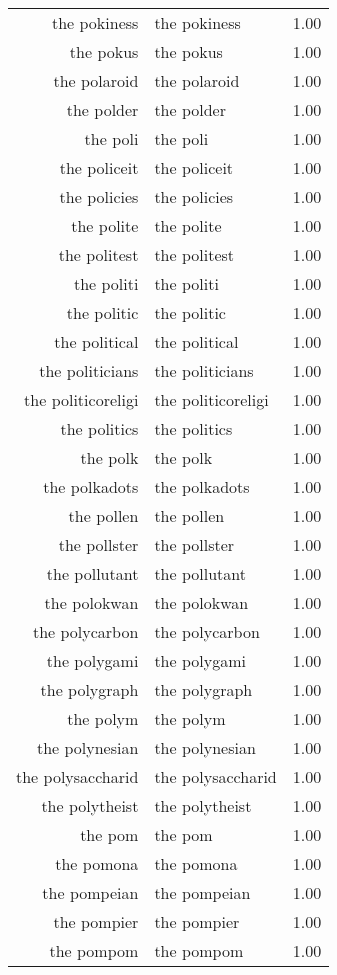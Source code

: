 \begin{table}[ht]
\begin{tabular}{rlr}
  the pokiness & the pokiness & 1.00 \\ 
  the pokus & the pokus & 1.00 \\ 
  the polaroid & the polaroid & 1.00 \\ 
  the polder & the polder & 1.00 \\ 
  the poli & the poli & 1.00 \\ 
  the policeit & the policeit & 1.00 \\ 
  the policies & the policies & 1.00 \\ 
  the polite & the polite & 1.00 \\ 
  the politest & the politest & 1.00 \\ 
  the politi & the politi & 1.00 \\ 
  the politic & the politic & 1.00 \\ 
  the political & the political & 1.00 \\ 
  the politicians & the politicians & 1.00 \\ 
  the politicoreligi & the politicoreligi & 1.00 \\ 
  the politics & the politics & 1.00 \\ 
  the polk & the polk & 1.00 \\ 
  the polkadots & the polkadots & 1.00 \\ 
  the pollen & the pollen & 1.00 \\ 
  the pollster & the pollster & 1.00 \\ 
  the pollutant & the pollutant & 1.00 \\ 
  the polokwan & the polokwan & 1.00 \\ 
  the polycarbon & the polycarbon & 1.00 \\ 
  the polygami & the polygami & 1.00 \\ 
  the polygraph & the polygraph & 1.00 \\ 
  the polym & the polym & 1.00 \\ 
  the polynesian & the polynesian & 1.00 \\ 
  the polysaccharid & the polysaccharid & 1.00 \\ 
  the polytheist & the polytheist & 1.00 \\ 
  the pom & the pom & 1.00 \\ 
  the pomona & the pomona & 1.00 \\ 
  the pompeian & the pompeian & 1.00 \\ 
  the pompier & the pompier & 1.00 \\ 
  the pompom & the pompom & 1.00 \\ 

\end{tabular}
\end{table}
